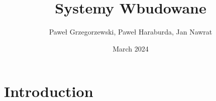 \documentclass{article}
\title{Systemy Wbudowane}
\author{Paweł Grzegorzewski, Paweł Haraburda, Jan Nawrat }
\date{March 2024}
\begin{document}
\maketitle

\section{Introduction}
\end{document}
